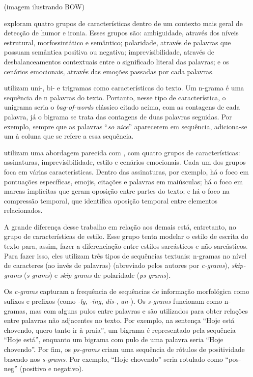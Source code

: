 (imagem ilustrando BOW)

\cite{reyes:2012:from-humor} exploram quatro grupos de características dentro de
um contexto mais geral de detecção de humor e ironia. Esses grupos são:
ambiguidade, através dos níveis estrutural, morfossintático e semântico;
polaridade, através de palavras que possuam semântica positiva ou negativa;
imprevisibilidade, através de desbalanceamentos contextuais entre o significado
literal das palavras; e os cenários emocionais, através das emoções passadas por
cada palavras.

\cite{liebrecht:2013:perfect-solution} utilizam uni-, bi- e trigramas como
características do texto. Um n-grama é uma sequência de n palavras do texto.
Portanto, nesse tipo de característica, o unigrama seria o \textit{bag-of-words}
clássico citado acima, com as contagens de cada palavra, já o bigrama se trata
das contagens de duas palavras seguidas. Por exemplo, sempre que as palavras
``\textit{so nice}'' aparecerem em sequência, adiciona-se um à coluna que se
refere a essa sequência.

\cite{reyes:2013:multidimensional-approach} utilizam uma abordagem parecida com
\cite{reyes:2012:from-humor}, com quatro grupos de características: assinaturas,
imprevisibilidade, estilo e cenários emocionais. Cada um dos grupos foca em
várias características. Dentro das assinaturas, por exemplo, há o foco em
pontuações específicas, emojis, citações e palavras em maiúsculas; há o foco em
marcas implícitas que geram oposição entre partes do texto; e há o foco na
compressão temporal, que identifica oposição temporal entre elementos
relacionados.

A grande diferença desse trabalho em relação aos demais está, entretanto, no
grupo de características de estilo. Esse grupo tenta modelar o estilo de escrita
do texto para, assim, fazer a diferenciação entre estilos sarcásticos e não
sarcásticos. Para fazer isso, eles utilizam três tipos de sequências textuais:
n-gramas no nível de caracteres (ao invés de palavras) (abreviado pelos autores
por \textit{c-grams}), \textit{skip-grams} (\textit{s-grams}) e
\textit{skip-grams} de polaridade (\textit{ps-grams}).

Os \textit{c-grams} capturam a frequência de sequências de informação
morfológica como sufixos e prefixos (como \textit{-ly}, \textit{-ing},
\textit{dis-}, \textit{un-}). Os \textit{s-grams} funcionam como n-gramas, mas
com alguns pulos entre palavras e são utilizados para obter relações entre
palavras não adjacentes no texto. Por exemplo, na sentença ``Hoje está chovendo,
quero tanto ir à praia'', um bigrama é representado pela sequência ``Hoje
está'', enquanto um bigrama com pulo de uma palavra seria ``Hoje chovendo''. Por
fim, os \textit{ps-grams} criam uma sequência de rótulos de positividade baseado
nos \textit{s-grams}. Por exemplo, ``Hoje chovendo'' seria rotulado como
``pos-neg'' (positivo e negativo).

